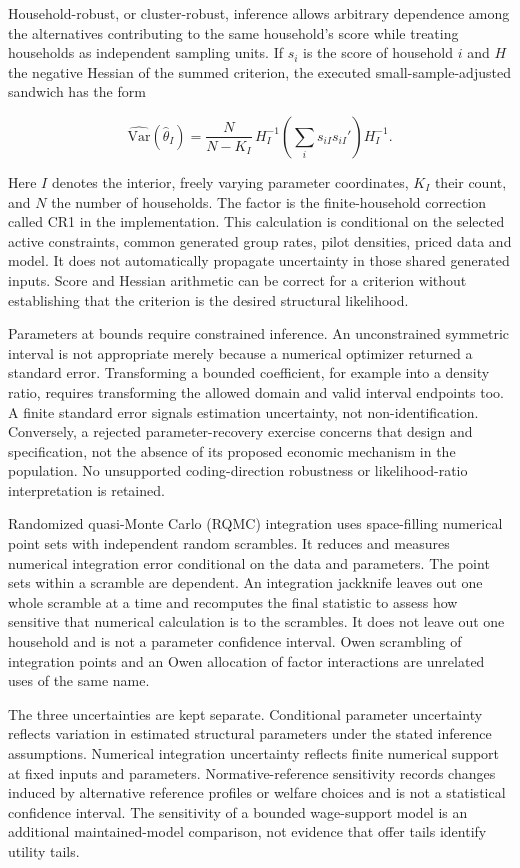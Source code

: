 \documentclass[11pt,a4paper]{article}
\begin{document}
Household-robust, or cluster-robust, inference allows arbitrary dependence among the alternatives contributing to the same household's score while treating households as independent sampling units. If \(s_i\) is the score of household \(i\) and \(H\) the negative Hessian of the summed criterion, the executed small-sample-adjusted sandwich has the form

\[\widehat{\mathrm{Var}}(\widehat\theta_I)=
\frac{N}{N-K_I}\,H_I^{-1}\left(\sum_i s_{iI}s_{iI}'\right)H_I^{-1}.\]

Here \(I\) denotes the interior, freely varying parameter coordinates, \(K_I\) their count, and \(N\) the number of households. The factor is the finite-household correction called CR1 in the implementation. This calculation is conditional on the selected active constraints, common generated group rates, pilot densities, priced data and model. It does not automatically propagate uncertainty in those shared generated inputs. Score and Hessian arithmetic can be correct for a criterion without establishing that the criterion is the desired structural likelihood.

Parameters at bounds require constrained inference. An unconstrained symmetric interval is not appropriate merely because a numerical optimizer returned a standard error. Transforming a bounded coefficient, for example into a density ratio, requires transforming the allowed domain and valid interval endpoints too. A finite standard error signals estimation uncertainty, not non-identification. Conversely, a rejected parameter-recovery exercise concerns that design and specification, not the absence of its proposed economic mechanism in the population. No unsupported coding-direction robustness or likelihood-ratio interpretation is retained.

Randomized quasi-Monte Carlo (RQMC) integration uses space-filling numerical point sets with independent random scrambles. It reduces and measures numerical integration error conditional on the data and parameters. The point sets within a scramble are dependent. An integration jackknife leaves out one whole scramble at a time and recomputes the final statistic to assess how sensitive that numerical calculation is to the scrambles. It does not leave out one household and is not a parameter confidence interval. Owen scrambling of integration points and an Owen allocation of factor interactions are unrelated uses of the same name.

The three uncertainties are kept separate. Conditional parameter uncertainty reflects variation in estimated structural parameters under the stated inference assumptions. Numerical integration uncertainty reflects finite numerical support at fixed inputs and parameters. Normative-reference sensitivity records changes induced by alternative reference profiles or welfare choices and is not a statistical confidence interval. The sensitivity of a bounded wage-support model is an additional maintained-model comparison, not evidence that offer tails identify utility tails.
\end{document}
